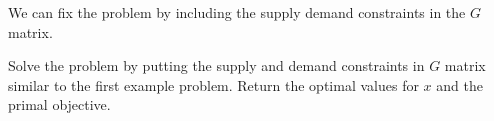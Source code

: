 We can fix the problem by including the supply demand constraints in the $G$ matrix.
\begin{problem}
Solve the problem by putting the supply and demand constraints in $G$ matrix similar to the first example problem. Return the optimal values for $x$ and the primal objective.
\end{problem}
\begin{comment}
\section*{Example}

Why are all of the terms in $G$ and $h$ non-positive?

\begin{lstlisting}
>>> from cvxopt import matrix, solvers
>>> G = matrix([ [-1., 0., 0., -1., 0.,  -1., 0., 0., 0., 0., 0.],
             [-1., 0., 0., 0., -1.,  0., -1., 0., 0., 0., 0.],
             [0., -1., 0., -1., 0.,  0., 0., -1., 0., 0., 0.],
             [0., -1., 0., 0., -1.,  0., 0., 0., -1., 0., 0.],
             [0., 0., -1., -1., 0.,  0., 0., 0., 0., -1., 0.],
             [0., 0., -1., 0., -1.,  0., 0., 0., 0., 0., -1.] ])

>>> h = matrix([-7., -2., -4., -5., -8.,  0., 0., 0., 0., 0., 0.,])
>>> c = matrix([4., 7., 6., 8., 8., 9])
>>> sol = solvers.lp(c,G,h)
>>> print sol['x']
>>> print sol['primal objective']
\end{lstlisting}

Another method is to use an integer linear program.
Cvxopt is configured to work with  Gnu, which does have an integer linear program.
It will work with either of the methods above. 

\textbf{Example}

glpk.ilp returns a tuple.
The first entry describes the optimality of the result, while the second gives the $x$ values.

\begin{lstlisting}
>>> from cvxopt import matrix, solvers, glpk
>>> G = matrix([ [-1., 0., 0., -1., 0.,  -1., 0., 0., 0., 0., 0.],
             [-1., 0., 0., 0., -1.,  0., -1., 0., 0., 0., 0.],
             [0., -1., 0., -1., 0.,  0., 0., -1., 0., 0., 0.],
             [0., -1., 0., 0., -1.,  0., 0., 0., -1., 0., 0.],
             [0., 0., -1., -1., 0.,  0., 0., 0., 0., -1., 0.],
             [0., 0., -1., 0., -1.,  0., 0., 0., 0., 0., -1.] ])

>>> h = matrix([-7., -2., -4., -5., -8.,  0., 0., 0., 0., 0., 0.,])
>>> o = matrix([4., 7., 6., 8., 8., 9])
>>> sol = glpk.ilp(o,G,h)
>>> print sol[1]
\end{lstlisting} 


\end{comment}

